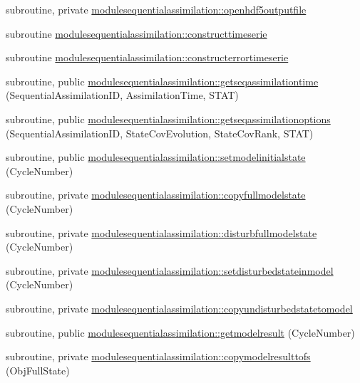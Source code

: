 \begin{DoxyCompactItemize}
subroutine, private \mbox{\hyperlink{namespacemodulesequentialassimilation_a6440d55f49615b21ea0d328d0121e669}{modulesequentialassimilation\+::openhdf5outputfile}}
\item 
subroutine \mbox{\hyperlink{namespacemodulesequentialassimilation_a9aa173ea83e0e960fe1561e3a9f183be}{modulesequentialassimilation\+::constructtimeserie}}
\item 
subroutine \mbox{\hyperlink{namespacemodulesequentialassimilation_aeee40d5724f1d4056ec3c81965e2d7c8}{modulesequentialassimilation\+::constructerrortimeserie}}
\item 
subroutine, public \mbox{\hyperlink{namespacemodulesequentialassimilation_a79adcfc8fb983a24237bd6bba818eca8}{modulesequentialassimilation\+::getseqassimilationtime}} (Sequential\+Assimilation\+ID, Assimilation\+Time, S\+T\+AT)
\item 
subroutine, public \mbox{\hyperlink{namespacemodulesequentialassimilation_a1df3565c62b239e627e2abf8edf5339e}{modulesequentialassimilation\+::getseqassimilationoptions}} (Sequential\+Assimilation\+ID, State\+Cov\+Evolution, State\+Cov\+Rank, S\+T\+AT)
\item 
subroutine, public \mbox{\hyperlink{namespacemodulesequentialassimilation_a0b54df1b07a9718187dcc6448f23026c}{modulesequentialassimilation\+::setmodelinitialstate}} (Cycle\+Number)
\item 
subroutine, private \mbox{\hyperlink{namespacemodulesequentialassimilation_a19283cb361ee6cdaa626fd20bad85d11}{modulesequentialassimilation\+::copyfullmodelstate}} (Cycle\+Number)
\item 
subroutine, private \mbox{\hyperlink{namespacemodulesequentialassimilation_a30f7a4267c0bcf30928733c782104389}{modulesequentialassimilation\+::disturbfullmodelstate}} (Cycle\+Number)
\item 
subroutine, private \mbox{\hyperlink{namespacemodulesequentialassimilation_a063e8f5d94cc80db103c79a0ec38a127}{modulesequentialassimilation\+::setdisturbedstateinmodel}} (Cycle\+Number)
\item 
subroutine, private \mbox{\hyperlink{namespacemodulesequentialassimilation_ad07159048364faf26c59ebffd5b246a3}{modulesequentialassimilation\+::copyundisturbedstatetomodel}}
\item 
subroutine, public \mbox{\hyperlink{namespacemodulesequentialassimilation_a817e5028ea901157ba1c90a514305c15}{modulesequentialassimilation\+::getmodelresult}} (Cycle\+Number)
\item 
subroutine, private \mbox{\hyperlink{namespacemodulesequentialassimilation_a1a5a1be9fa72ef3b8fe621128b7e3759}{modulesequentialassimilation\+::copymodelresulttofs}} (Obj\+Full\+State)

\end{DoxyCompactItemize}
